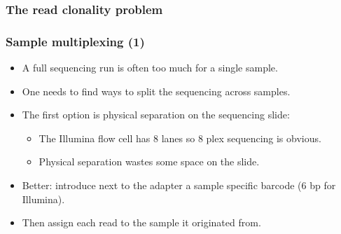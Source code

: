 \documentclass{beamer}
\begin{document}
\begin{frame}
  \frametitle{The read clonality problem}
  \begin{center}
  \end{center}
\end{frame}


\begin{frame}
  \frametitle{Sample multiplexing (1)}
  \begin{itemize}
  \item A full sequencing run is often too much for a single sample.
  \item One needs to find ways to split the sequencing across samples.
  \item The first option is physical separation on the sequencing slide:
    \begin{itemize}
    \item The Illumina flow cell has 8 lanes so 8 plex sequencing is obvious.
    \item Physical separation wastes some space on the slide.
    \end{itemize}
  \item Better: introduce next to the adapter a sample specific barcode (6 bp for Illumina).
  \item Then assign each read to the sample it originated from.
  \end{itemize}
\end{frame}
\end{document}
